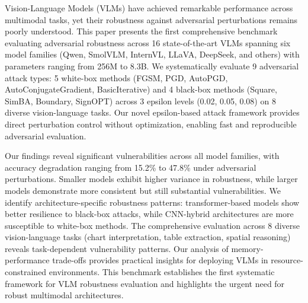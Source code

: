 Vision-Language Models (VLMs) have achieved remarkable performance across multimodal tasks, yet their robustness against adversarial perturbations remains poorly understood. This paper presents the first comprehensive benchmark evaluating adversarial robustness across 16 state-of-the-art VLMs spanning six model families (Qwen, SmolVLM, InternVL, LLaVA, DeepSeek, and others) with parameters ranging from 256M to 8.3B. We systematically evaluate 9 adversarial attack types: 5 white-box methods (FGSM, PGD, AutoPGD, AutoConjugateGradient, BasicIterative) and 4 black-box methods (Square, SimBA, Boundary, SignOPT) across 3 epsilon levels (0.02, 0.05, 0.08) on 8 diverse vision-language tasks. Our novel epsilon-based attack framework provides direct perturbation control without optimization, enabling fast and reproducible adversarial evaluation.

Our findings reveal significant vulnerabilities across all model families, with accuracy degradation ranging from 15.2\% to 47.8\% under adversarial perturbations. Smaller models exhibit higher variance in robustness, while larger models demonstrate more consistent but still substantial vulnerabilities. We identify architecture-specific robustness patterns: transformer-based models show better resilience to black-box attacks, while CNN-hybrid architectures are more susceptible to white-box methods. The comprehensive evaluation across 8 diverse vision-language tasks (chart interpretation, table extraction, spatial reasoning) reveals task-dependent vulnerability patterns. Our analysis of memory-performance trade-offs provides practical insights for deploying VLMs in resource-constrained environments. This benchmark establishes the first systematic framework for VLM robustness evaluation and highlights the urgent need for robust multimodal architectures.
